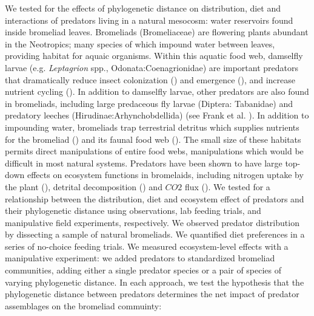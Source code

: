 \documentclass[11pt]{article}
\begin{document}
We tested for the effects of phylogenetic distance on distribution, diet
and interactions of predators living in a natural mesocosm: water
reservoirs found inside bromeliad leaves. Bromeliads (Bromeliaceae) are 
flowering plants abundant in the Neotropics; many species of which impound water between leaves, providing habitat for aquaic organisms. Within this aquatic food
web, damselfly larvae (e.g. \emph{Leptagrion} spp.,
Odonata:Coenagrionidae) are important predators that dramatically reduce
insect colonization (\citealt{Hammill2015}) and emergence
(\citealt{Starzomski2010}), and increase nutrient cycling (\citealt{Ngai2006}).
In addition to damselfly larvae, other predators are also found in
bromeliads, including large predaceous fly larvae (Diptera: Tabanidae)
and predatory leeches (Hirudinae:Arhynchobdellida) (see Frank et al.
\citeyearpar{Frank2009}).  In addition to impounding water,  bromeliads trap terrestrial detritus which supplies nutrients for the bromeliad (\citealt{Reich2003a}) and its faunal food web (\citealt{Farjalla2016}). The small size of these habitats permits direct
manipulations of entire food webs, manipulations which would be
difficult in most natural systems. Predators have been shown to have
large top-down effects on ecosystem functions in bromelaids, including
nitrogen uptake by the plant (\citealt{Ngai2006}), detrital decomposition (\citealt{Srivastava2006a})
and $CO2$ flux (\citealt{Atwood2014, Atwood2013}).
We tested for a relationship between the distribution, diet and
ecosystem effect of predators and their phylogenetic distance using
observations, lab feeding trials, and manipulative field experiments,
respectively. We observed predator distribution by dissecting a sample
of natural bromeliads. We quantified diet preferences in a series of
no-choice feeding trials. We measured ecosystem-level effects with a
manipulative experiment: we added predators to standardized bromeliad communities, adding either a single predator species or a pair of species of varying phylogenetic distance. In each approach, we test the hypothesis that the phylogenetic distance between predators determines the net impact of predator assemblages on the bromeliad commuinty:
\end{document}
